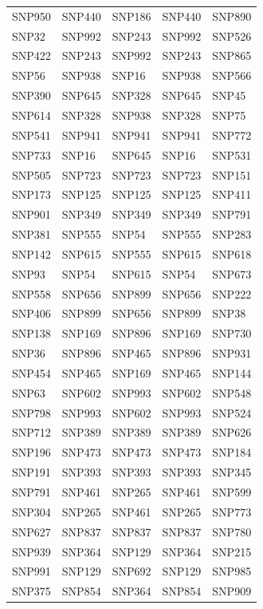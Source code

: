 \begin{table}[ht]
\begin{tabular}{lllll}
  SNP950 & SNP440 & SNP186 & SNP440 & SNP890 \\ 
  SNP32 & SNP992 & SNP243 & SNP992 & SNP526 \\ 
  SNP422 & SNP243 & SNP992 & SNP243 & SNP865 \\ 
  SNP56 & SNP938 & SNP16 & SNP938 & SNP566 \\ 
  SNP390 & SNP645 & SNP328 & SNP645 & SNP45 \\ 
  SNP614 & SNP328 & SNP938 & SNP328 & SNP75 \\ 
  SNP541 & SNP941 & SNP941 & SNP941 & SNP772 \\ 
  SNP733 & SNP16 & SNP645 & SNP16 & SNP531 \\ 
  SNP505 & SNP723 & SNP723 & SNP723 & SNP151 \\ 
  SNP173 & SNP125 & SNP125 & SNP125 & SNP411 \\ 
  SNP901 & SNP349 & SNP349 & SNP349 & SNP791 \\ 
  SNP381 & SNP555 & SNP54 & SNP555 & SNP283 \\ 
  SNP142 & SNP615 & SNP555 & SNP615 & SNP618 \\ 
  SNP93 & SNP54 & SNP615 & SNP54 & SNP673 \\ 
  SNP558 & SNP656 & SNP899 & SNP656 & SNP222 \\ 
  SNP406 & SNP899 & SNP656 & SNP899 & SNP38 \\ 
  SNP138 & SNP169 & SNP896 & SNP169 & SNP730 \\ 
  SNP36 & SNP896 & SNP465 & SNP896 & SNP931 \\ 
  SNP454 & SNP465 & SNP169 & SNP465 & SNP144 \\ 
  SNP63 & SNP602 & SNP993 & SNP602 & SNP548 \\ 
  SNP798 & SNP993 & SNP602 & SNP993 & SNP524 \\ 
  SNP712 & SNP389 & SNP389 & SNP389 & SNP626 \\ 
  SNP196 & SNP473 & SNP473 & SNP473 & SNP184 \\ 
  SNP191 & SNP393 & SNP393 & SNP393 & SNP345 \\ 
  SNP791 & SNP461 & SNP265 & SNP461 & SNP599 \\ 
  SNP304 & SNP265 & SNP461 & SNP265 & SNP773 \\ 
  SNP627 & SNP837 & SNP837 & SNP837 & SNP780 \\ 
  SNP939 & SNP364 & SNP129 & SNP364 & SNP215 \\ 
  SNP991 & SNP129 & SNP692 & SNP129 & SNP985 \\ 
  SNP375 & SNP854 & SNP364 & SNP854 & SNP909 \\ 

\end{tabular}
\end{table}
